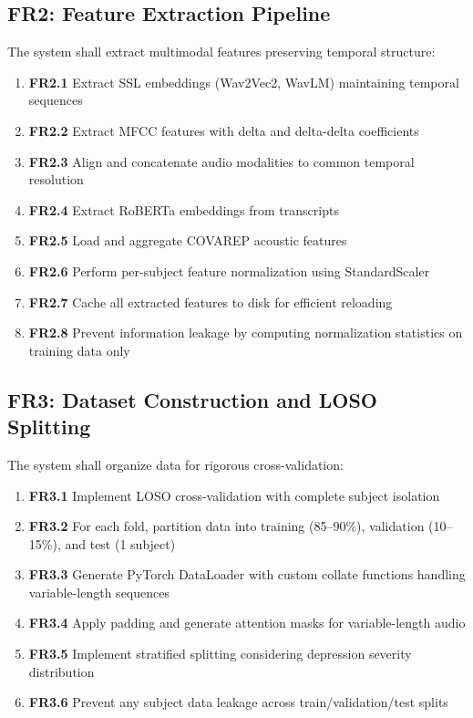 \documentclass[12pt]{article}
\begin{document}
	\subsection{FR2: Feature Extraction Pipeline}

	The system shall extract multimodal features preserving temporal structure:

	\begin{enumerate}
		\item \textbf{FR2.1} Extract SSL embeddings (Wav2Vec2, WavLM) maintaining temporal sequences
		\item \textbf{FR2.2} Extract MFCC features with delta and delta-delta coefficients
		\item \textbf{FR2.3} Align and concatenate audio modalities to common temporal resolution
		\item \textbf{FR2.4} Extract RoBERTa embeddings from transcripts
		\item \textbf{FR2.5} Load and aggregate COVAREP acoustic features
		\item \textbf{FR2.6} Perform per-subject feature normalization using StandardScaler
		\item \textbf{FR2.7} Cache all extracted features to disk for efficient reloading
		\item \textbf{FR2.8} Prevent information leakage by computing normalization statistics on training data only
	\end{enumerate}

	\subsection{FR3: Dataset Construction and LOSO Splitting}

	The system shall organize data for rigorous cross-validation:

	\begin{enumerate}
		\item \textbf{FR3.1} Implement LOSO cross-validation with complete subject isolation
		\item \textbf{FR3.2} For each fold, partition data into training (85--90\%), validation (10--15\%), and test (1 subject)
		\item \textbf{FR3.3} Generate PyTorch DataLoader with custom collate functions handling variable-length sequences
		\item \textbf{FR3.4} Apply padding and generate attention masks for variable-length audio
		\item \textbf{FR3.5} Implement stratified splitting considering depression severity distribution
		\item \textbf{FR3.6} Prevent any subject data leakage across train/validation/test splits
	\end{enumerate}
\end{document}
